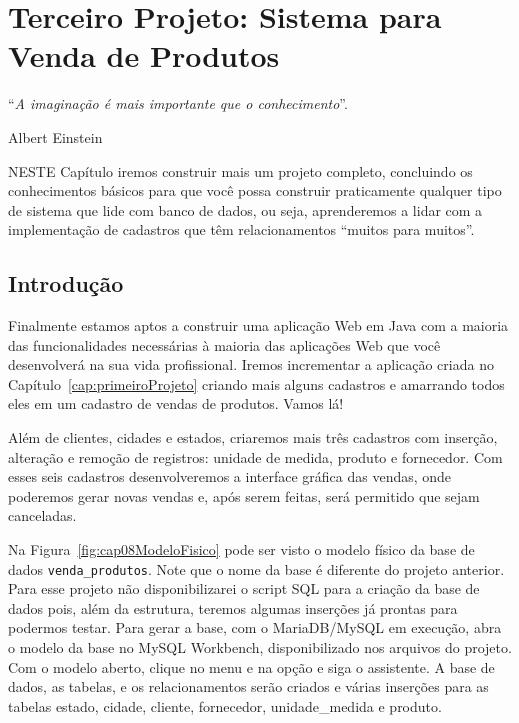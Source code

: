 \chapter{Terceiro Projeto: Sistema para Venda de Produtos}\label{cap:terceiroProjeto}
\epigraph{``\textit{A imaginação é mais importante que o conhecimento}''.}{Albert Einstein}

\lettrine[lines=4, lhang=0.1, lraise=0, loversize=0.2, findent=0.1em]{\textcolor{corAzulTema}{N}}{ESTE} Capítulo iremos construir mais um projeto completo, concluindo os conhecimentos básicos para que você possa construir praticamente qualquer tipo de sistema que lide com banco de dados, ou seja, aprenderemos a lidar com a implementação de cadastros que têm relacionamentos ``muitos para muitos''.


\section{Introdução}

Finalmente estamos aptos a construir uma aplicação Web em Java com a maioria das funcionalidades necessárias à maioria das aplicações Web que você desenvolverá na sua vida profissional. Iremos incrementar a aplicação criada no Capítulo~\ref{cap:primeiroProjeto} criando mais alguns cadastros e amarrando todos eles em um cadastro de vendas de produtos. Vamos lá!

Além de clientes, cidades e estados, criaremos mais três cadastros com inserção, alteração e remoção de registros: unidade de medida, produto e fornecedor. Com esses seis cadastros desenvolveremos a interface gráfica das vendas, onde poderemos gerar novas vendas e, após serem feitas, será permitido que sejam canceladas.

Na Figura~\ref{fig:cap08ModeloFisico} pode ser visto o modelo físico da base de dados \texttt{venda\_produtos}. Note que o nome da base é diferente do projeto anterior. Para esse projeto não disponibilizarei o script SQL para a criação da base de dados pois, além da estrutura, teremos algumas inserções já prontas para podermos testar. Para gerar a base, com o MariaDB/MySQL em execução, abra o modelo da base no MySQL Workbench, disponibilizado nos arquivos do projeto. Com o modelo aberto, clique no menu  e na opção  e siga o assistente. A base de dados, as tabelas, e os relacionamentos serão criados e várias inserções para as tabelas estado, cidade, cliente, fornecedor, unidade\_medida e produto.

